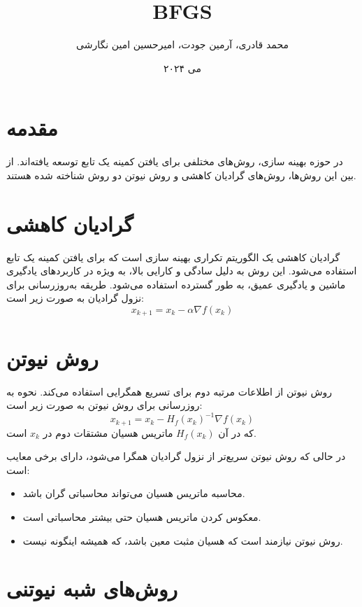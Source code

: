 \documentclass{article}
\title{BFGS}
\author{محمد قادری، آرمین جودت، امیرحسین امین نگارشی}
\date{می ۲۰۲۴}
\begin{document}
\maketitle

\section{مقدمه}

در حوزه بهینه‌ سازی، روش‌های مختلفی برای یافتن کمینه یک تابع توسعه یافته‌اند. از بین این روش‌ها، روش‌های گرادیان کاهشی و روش نیوتن دو روش شناخته شده هستند.

\section{گرادیان کاهشی}

گرادیان کاهشی یک الگوریتم تکراری بهینه‌ سازی است که برای یافتن کمینه یک تابع استفاده می‌شود. این روش به دلیل سادگی و کارایی بالا، به ویژه در کاربردهای یادگیری ماشین و یادگیری عمیق، به طور گسترده استفاده می‌شود. طریقه  به‌روزرسانی برای نزول گرادیان به صورت زیر است:
\begin{equation}
x_{k+1} = x_k - \alpha \nabla f(x_k)
\end{equation}
 

\section{روش نیوتن}

روش نیوتن از اطلاعات مرتبه دوم برای تسریع همگرایی استفاده می‌کند. نحوه به‌ روزرسانی برای روش نیوتن به صورت زیر است:
\begin{equation}
x_{k+1} = x_k - H_f(x_k)^{-1} \nabla f(x_k)
\end{equation}
که در آن \( H_f(x_k) \) ماتریس هسیان مشتقات دوم در \( x_k \) است.

در حالی که روش نیوتن سریع‌تر از نزول گرادیان همگرا می‌شود، دارای برخی معایب است:
\begin{itemize}
    \item محاسبه ماتریس هسیان می‌تواند محاسباتی گران باشد.
    \item معکوس کردن ماتریس هسیان حتی بیشتر محاسباتی است.
    \item روش نیوتن نیازمند است که هسیان مثبت معین باشد، که همیشه اینگونه نیست.
\end{itemize}

\section{روش‌های شبه نیوتنی}
\end{document}
